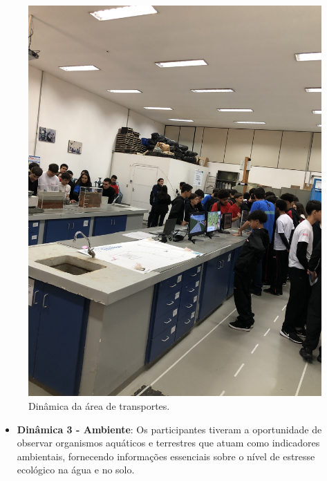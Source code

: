 \documentclass[
  letterpaper,
  DIV=11,
  numbers=noendperiod]{scrreprt}
\providecommand{\tightlist}{%
  \setlength{\itemsep}{0pt}\setlength{\parskip}{0pt}}\usepackage{longtable,booktabs,array}
\begin{document}
\begin{figure}[H]

{\centering \includegraphics[width=0.6\linewidth,height=\textheight,keepaspectratio]{planejamento/dinamica-transportes.jpg}

}

\caption{Dinâmica da área de transportes.}

\end{figure}%

\begin{itemize}
\tightlist
\item
  \textbf{Dinâmica 3 - Ambiente}: Os participantes tiveram a
  oportunidade de observar organismos aquáticos e terrestres que atuam
  como indicadores ambientais, fornecendo informações essenciais sobre o
  nível de estresse ecológico na água e no solo.
\end{itemize}
\end{document}
